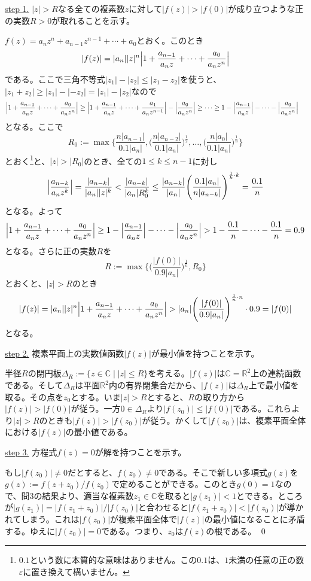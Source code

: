 \noindent \underline{step 1.} $|z|>R$なる全ての複素数$z$に対して$|f(z)|>|f(0)|$が成り立つような正の実数$R>0$が取れることを示す。

$f(z)=a_n z^n + a_{n-1} z^{n-1} + \cdots + a_0$とおく。このとき
\[
|f(z)| = |a_n||z|^n\Bigl|1+\frac{a_{n-1}}{a_n z} + \cdots + \frac{a_0}{a_n z^n}\Bigr|
\]
である。ここで三角不等式$|z_1|-|z_2|\leq|z_1-z_2|$を使うと、$|z_1+z_2|\geq|z_1|-|-z_2|=|z_1|-|z_2|$なので
\begin{align*}
\Bigl|1+\frac{a_{n-1}}{a_n z} + \cdots + \frac{a_0}{a_n z^n}\Bigr|
&\geq \Bigl|1+\frac{a_{n-1}}{a_n z} + \cdots + \frac{a_1}{a_n z^{n-1}}\Bigr| - \Bigl|\frac{a_0}{a_n z^n}\Bigr| \geq \cdots
\geq 1-\Bigl|\frac{a_{n-1}}{a_n z}\Bigr| - \cdots -\Bigl|\frac{a_{0}}{a_n z^n}\Bigr|
\end{align*}
となる。ここで
\[
R_0:=\max\Biggl\{\frac{n|a_{n-1}|}{0.1|a_n|},\Biggl(\frac{n|a_{n-2}|}{0.1|a_n|}\Biggr)^{\frac{1}{2}},\ldots,\Biggl(\frac{n|a_{0}|}{0.1|a_n|}\Biggr)^{\frac{1}{n}}\Biggr\}
\]
とおく\footnote{$0.1$という数に本質的な意味はありません。この$0.1$は、$1$未満の任意の正の数$\varepsilon$に置き換えて構いません。}と、$|z|>|R_0|$のとき、全ての$1\leq k\leq n-1$に対し
\[
\Bigl|\frac{a_{n-k}}{a_n z^k}\Bigr| = \frac{|a_{n-k}|}{|a_n||z|^k} < \frac{|a_{n-k}|}{|a_n|R_0^k} \leq \frac{|a_{n-k}|}{|a_n|}\Biggl(\frac{0.1|a_n|}{n|a_{n-k}|}\Biggr)^{\frac{1}{k}\cdot k} = \frac{0.1}{n}
\]
となる。よって
\[
\Bigl|1+\frac{a_{n-1}}{a_n z} + \cdots + \frac{a_0}{a_n z^n}\Bigr| \geq
1-\Bigl|\frac{a_{n-1}}{a_n z}\Bigr| - \cdots -\Bigl|\frac{a_{0}}{a_n z^n}\Bigr|
> 1-\frac{0.1}{n}-\cdots-\frac{0.1}{n} = 0.9
\]
となる。さらに正の実数$R$を
\[
R:=\max\Biggl\{\Biggl(\frac{|f(0)|}{0.9|a_n|}\Biggr)^{\frac{1}{n}},R_0\Biggr\}
\]
とおくと、$|z|>R$のとき
\[
|f(z)| = |a_n||z|^n\Bigl|1+\frac{a_{n-1}}{a_n z} + \cdots + \frac{a_0}{a_n z^n}\Bigr| > |a_n|\Biggl(\frac{|f(0)|}{0.9|a_n|}\Biggr)^{\frac{1}{n}\cdot n} \cdot 0.9 = |f(0)|
\]
となる。

\noindent \underline{step 2.} 複素平面上の実数値函数$|f(z)|$が最小値を持つことを示す。

半径$R$の閉円板$\Delta_R:=\{z\in\mathbb{C}\mid |z|\leq R\}$を考える。$|f(z)|$は$\mathbb{C}=\mathbb{R}^2$上の連続函数である。そして$\Delta_R$は平面$\mathbb{R}^2$内の有界閉集合だから、$|f(z)|$は$\Delta_R$上で最小値を取る。その点を$z_0$とする。いま$|z|>R$とすると、$R$の取り方から$|f(z)|>|f(0)|$が従う。一方$0\in\Delta_R$より$|f(z_0)|\leq |f(0)|$である。これらより$|z|>R$のときも$|f(z)|>|f(z_0)|$が従う。かくして$|f(z_0)|$は、複素平面全体における$|f(z)|$の最小値である。

\noindent \underline{step 3.} 方程式$f(z)=0$が解を持つことを示す。

もし$|f(z_0)|\neq 0$だとすると、$f(z_0)\neq 0$である。そこで新しい多項式$g(z)$を$g(z):=f(z+z_0)/f(z_0)$で定めることができる。このとき$g(0)=1$なので、問3の結果より、適当な複素数$z_1\in\mathbb{C}$を取ると$|g(z_1)|<1$とできる。ところが$|g(z_1)| = |f(z_1+z_0)| / |f(z_0)|$と合わせると$|f(z_1+z_0)| < |f(z_0)|$が導かれてしまう。これは$|f(z_0)|$が複素平面全体で$|f(z)|$の最小値になることに矛盾する。ゆえに$|f(z_0)|=0$である。つまり、$z_0$は$f(z)$の根である。 \qed

